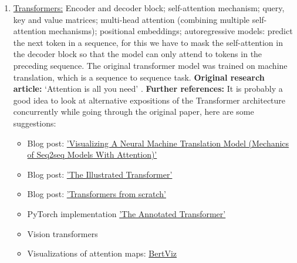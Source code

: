 \documentclass[11pt, a4paper]{amsart}
\begin{document}
\begin{enumerate}[resume]
    \item \underline{Transformers:}
    \newline
    Encoder and decoder block; self-attention mechanism; query, key and value matrices; multi-head attention (combining multiple self-attention mechanisms); positional embeddings; autoregressive models: predict the next token in a sequence, for this we have to mask the self-attention in the decoder block so that the model can only attend to tokens in the preceding sequence.
    The original transformer model was trained on machine translation, which is a sequence to sequence task.
    \newline
    \textbf{Original research article:} `Attention is all you need' \cite{DBLP:journals/corr/VaswaniSPUJGKP17}.
    \newline
    \textbf{Further references:}
    It is probably a good idea to look at alternative expositions of the Transformer architecture concurrently while going through the original paper, here are some suggestions:
    \begin{itemize}
        \item Blog post:
        \href{https://jalammar.github.io/visualizing-neural-machine-translation-mechanics-of-seq2seq-models-with-attention/}{'Visualizing A Neural Machine Translation Model (Mechanics of Seq2seq Models With Attention)'}
        \item Blog post:
        \href{https://jalammar.github.io/illustrated-transformer/}{'The Illustrated Transformer'}
        \item Blog post:
        \href{http://peterbloem.nl/blog/transformers}{'Transformers from scratch'}
        \item PyTorch implementation \href{https://nlp.seas.harvard.edu/2018/04/03/attention.html}{'The Annotated Transformer'}
        \item Vision transformers \cite{dosovitskiy2021an}
        \item Visualizations of attention maps:
        \href{https://github.com/jessevig/bertviz}{BertViz}
    \end{itemize}
    

\end{enumerate}
\end{document}
